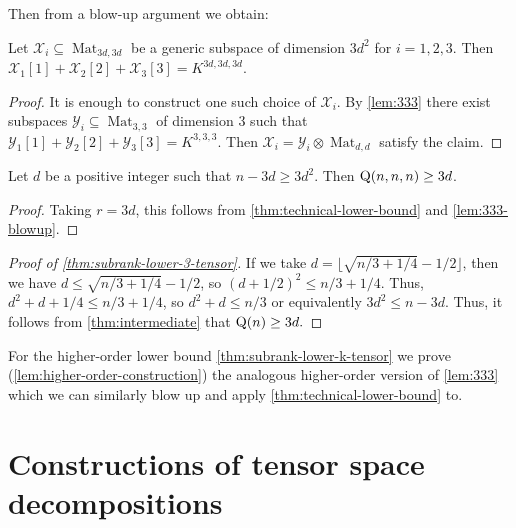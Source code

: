 \documentclass[10pt,a4paper]{article}
\theoremstyle{definition}
\theoremstyle{remark}
\newcommand{\gensubrank}{{\rm Q}}
\newcommand{\Mat}{\operatorname{Mat}}
\begin{document}
Then from a blow-up argument we obtain:

\begin{lemma}\label{lem:333-blowup}
Let $\mathcal{X}_i \subseteq \Mat_{3d,3d}$ be a generic subspace of dimension $3d^2$ for $i=1,2,3$. Then $\mathcal{X}_1[1]+\mathcal{X}_2[2]+\mathcal{X}_3[3] = K^{3d, 3d, 3d}$.
\end{lemma}
\begin{proof}
It is enough to construct one such choice of $\mathcal{X}_i$. By \autoref{lem:333} there exist subspaces $\mathcal{Y}_i \subseteq \Mat_{3,3}$ of dimension 3 such that $\mathcal{Y}_1[1]+\mathcal{Y}_2[2]+\mathcal{Y}_3[3] = K^{3,3,3}$. Then $\mathcal{X}_i = \mathcal{Y}_i \otimes \Mat_{d,d}$ satisfy the claim.
\end{proof}

\begin{theorem}\label{thm:intermediate}
Let $d$ be a positive integer such that $n-3d \geq 3d^2$. Then $\gensubrank(n,n,n) \geq 3d$.
\end{theorem}
\begin{proof}
Taking $r = 3d$, this follows from \autoref{thm:technical-lower-bound} and \autoref{lem:333-blowup}.
\end{proof}

\begin{proof}[Proof of \autoref{thm:subrank-lower-3-tensor}]
If we take $d = \lfloor \sqrt{ n/3 + 1/4}   - 1/2 \rfloor$, then we have 
$d \leq \sqrt{n/3 + 1/4} - 1/2$, so $(d+1/2)^2 \leq n/3 + 1/4$. Thus, $d^2 + d + 1/4 \leq n/3 + 1/4$, so $d^2 + d \leq n/3$ or equivalently $3d^2 \leq n-3d$. Thus, it follows from \autoref{thm:intermediate} that $\gensubrank(n) \geq 3d.$
\end{proof}

For the higher-order lower bound \autoref{thm:subrank-lower-k-tensor}
we prove (\autoref{lem:higher-order-construction}) the analogous higher-order version of \autoref{lem:333} which we can similarly blow up and apply \autoref{thm:technical-lower-bound} to.

\section{Constructions of tensor space decompositions}\label{sec:constructions}


\newcommand{\kar} {{\rm char}}
\newcommand{\R}{{\mathbb R}}
\newcommand{\Rep}{{\rm Rep}}
\newcommand{\SI}{{\rm SI}}
\newcommand{\SO}{{\rm SO}}
\newcommand{\ST}{{\rm ST}}
\newcommand{\PD} {{\rm PD}}
\newcommand{\mlt}{{\rm mlt}}
\newcommand{\Lie} {{\rm Lie}}
\end{document}
